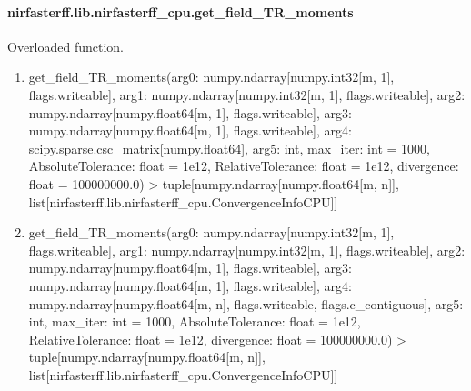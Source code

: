 \documentclass[letterpaper,10pt,english]{sphinxmanual}
\begin{document}
\sphinxstepscope


\paragraph{nirfasterff.lib.nirfasterff\_cpu.get\_field\_TR\_moments}
\label{\detokenize{_autosummary/nirfasterff.lib.nirfasterff_cpu.get_field_TR_moments:nirfasterff-lib-nirfasterff-cpu-get-field-tr-moments}}\label{\detokenize{_autosummary/nirfasterff.lib.nirfasterff_cpu.get_field_TR_moments::doc}}

\begin{fulllineitems}
\label{\detokenize{_autosummary/nirfasterff.lib.nirfasterff_cpu.get_field_TR_moments:nirfasterff.lib.nirfasterff_cpu.get_field_TR_moments}}
\pysigstartsignatures
{}
\pysigstopsignatures
\sphinxAtStartPar
Overloaded function.
\begin{enumerate}
%
\item {} 
\sphinxAtStartPar
get\_field\_TR\_moments(arg0: numpy.ndarray{[}numpy.int32{[}m, 1{]}, flags.writeable{]}, arg1: numpy.ndarray{[}numpy.int32{[}m, 1{]}, flags.writeable{]}, arg2: numpy.ndarray{[}numpy.float64{[}m, 1{]}, flags.writeable{]}, arg3: numpy.ndarray{[}numpy.float64{[}m, 1{]}, flags.writeable{]}, arg4: scipy.sparse.csc\_matrix{[}numpy.float64{]}, arg5: int, max\_iter: int = 1000, AbsoluteTolerance: float = 1e\sphinxhyphen{}12, RelativeTolerance: float = 1e\sphinxhyphen{}12, divergence: float = 100000000.0) \sphinxhyphen{}\textgreater{} tuple{[}numpy.ndarray{[}numpy.float64{[}m, n{]}{]}, list{[}nirfasterff.lib.nirfasterff\_cpu.ConvergenceInfoCPU{]}{]}

\item {} 
\sphinxAtStartPar
get\_field\_TR\_moments(arg0: numpy.ndarray{[}numpy.int32{[}m, 1{]}, flags.writeable{]}, arg1: numpy.ndarray{[}numpy.int32{[}m, 1{]}, flags.writeable{]}, arg2: numpy.ndarray{[}numpy.float64{[}m, 1{]}, flags.writeable{]}, arg3: numpy.ndarray{[}numpy.float64{[}m, 1{]}, flags.writeable{]}, arg4: numpy.ndarray{[}numpy.float64{[}m, n{]}, flags.writeable, flags.c\_contiguous{]}, arg5: int, max\_iter: int = 1000, AbsoluteTolerance: float = 1e\sphinxhyphen{}12, RelativeTolerance: float = 1e\sphinxhyphen{}12, divergence: float = 100000000.0) \sphinxhyphen{}\textgreater{} tuple{[}numpy.ndarray{[}numpy.float64{[}m, n{]}{]}, list{[}nirfasterff.lib.nirfasterff\_cpu.ConvergenceInfoCPU{]}{]}

\end{enumerate}

\end{fulllineitems}
\end{document}
